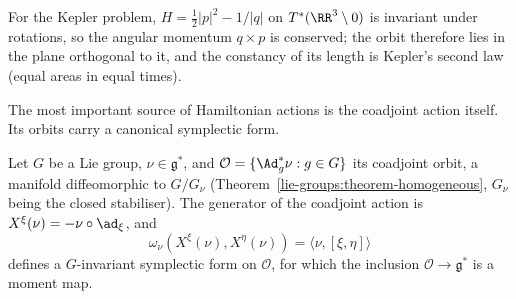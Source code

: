 For the Kepler problem, $H = \frac12|p|^2 - 1/|q|$ on $T^*(\RR^3 \setminus 0)$ is invariant under rotations, so the angular momentum $q \times p$ is conserved; the orbit therefore lies in the plane orthogonal to it, and
the constancy of its length is Kepler's second law (equal areas in equal times).

The most important source of Hamiltonian actions is the coadjoint action itself. Its orbits carry a canonical symplectic form.

\begin{proposition}\label{symplectic-geometry:proposition-kks}
Let $G$ be a Lie group, $\nu \in \mathfrak{g}^*$, and $\mathcal{O} = \{\Ad^*_g\nu : g \in G\}$ its coadjoint orbit, a manifold diffeomorphic to $G/G_\nu$ (Theorem~\ref{lie-groups:theorem-homogeneous}, $G_\nu$ being the closed
stabiliser). The generator of the coadjoint action is $X^\xi(\nu) = -\nu \circ \ad_\xi$, and
\[
\omega_\nu(X^\xi(\nu), X^\eta(\nu)) = \langle\nu, [\xi, \eta]\rangle
\]
defines a $G$-invariant symplectic form on $\mathcal{O}$, for which the inclusion $\mathcal{O} \to \mathfrak{g}^*$ is a moment map.
\end{proposition}

